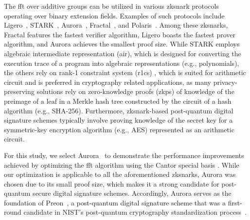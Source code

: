 The \gls{fft} over additive groups can be utilized in various \gls{zksnark} protocols operating over binary extension fields. Examples of such protocols include Ligero~\cite{Ames2017Ligero}, STARK~\cite{Ben-Sasson2018STARK}, Aurora~\cite{Aurora2019}, Fractal~\cite{Chiesa2020Fractal}, and Polaris~\cite{Polaris}. Among these \gls{zksnark}s, Fractal features the fastest verifier algorithm, Ligero boasts the fastest prover algorithm, and Aurora achieves the smallest proof size. While STARK employs algebraic intermediate representation (\gls{air}), which is designed for converting the execution trace of a program into algebraic representations (e.g., polynomials), the others rely on rank-1 constraint system (\gls{r1cs}) \cite{Gong2024}, which is suited for arithmetic circuit and is preferred in cryptography related applications, as many privacy-preserving solutions rely on zero-knowledge proofs (\gls{zkp}s) of knowledge of the preimage of a leaf in a Merkle hash tree constructed by the circuit of a hash algorithm (e.g., SHA-256). Furthermore, \gls{zksnark}-based post-quantum digital signature schemes typically involve proving knowledge of the secret key for a symmetric-key encryption algorithm (e.g., AES) represented as an arithmetic circuit.

For this study, we select Aurora~\cite{Aurora2019} to demonstrate the performance improvements achieved by optimizing the \gls{fft} algorithm using the Cantor special basis \cite{Cantor1989FFT}. While our optimization is applicable to all the aforementioned \gls{zksnark}s, Aurora was chosen due to its small proof size, which makes it a strong candidate for post-quantum secure digital signature schemes. Accordingly, Aurora serves as the foundation of Preon~\cite{Preon2023}, a post-quantum digital signature scheme that was a first-round candidate in NIST’s post-quantum cryptography standardization process~\cite{nist_pqc_round1_signatures}.

